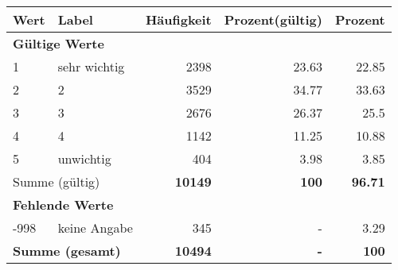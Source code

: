      \begin{longtable}{lXrrr}
     \toprule
     \textbf{Wert} & \textbf{Label} & \textbf{Häufigkeit} & \textbf{Prozent(gültig)} & \textbf{Prozent} \\
     \endhead
     \midrule
     \multicolumn{5}{l}{\textbf{Gültige Werte}}\\

     1 &
     \multicolumn{1}{X}{ sehr wichtig   } &


       \num{2398} &
       \num[round-mode=places,round-precision=2]{23,63} &
         \num[round-mode=places,round-precision=2]{22,85} \\

     2 &
     \multicolumn{1}{X}{ 2   } &


       \num{3529} &
       \num[round-mode=places,round-precision=2]{34,77} &
         \num[round-mode=places,round-precision=2]{33,63} \\

     3 &
     \multicolumn{1}{X}{ 3   } &


       \num{2676} &
       \num[round-mode=places,round-precision=2]{26,37} &
         \num[round-mode=places,round-precision=2]{25,5} \\

     4 &
     \multicolumn{1}{X}{ 4   } &


       \num{1142} &
       \num[round-mode=places,round-precision=2]{11,25} &
         \num[round-mode=places,round-precision=2]{10,88} \\

     5 &
     \multicolumn{1}{X}{ unwichtig   } &


       \num{404} &
       \num[round-mode=places,round-precision=2]{3,98} &
         \num[round-mode=places,round-precision=2]{3,85} \\
     \midrule
     \multicolumn{2}{l}{Summe (gültig)} &
       \textbf{\num{10149}} &
     \textbf{100} &
       \textbf{\num[round-mode=places,round-precision=2]{96,71}} \\
     \multicolumn{5}{l}{\textbf{Fehlende Werte}}\\
       -998 &
       keine Angabe &
         \num{345} &
        - &
         \num[round-mode=places,round-precision=2]{3,29} \\
     \midrule
     \multicolumn{2}{l}{\textbf{Summe (gesamt)}} &
          \textbf{\num{10494}} &
        \textbf{-} &
        \textbf{100} \\
     \bottomrule
     \end{longtable}
     
